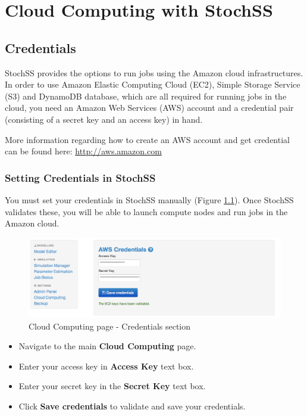 \chapter{Cloud Computing with StochSS}

\section{Credentials}
StochSS provides the options to run jobs using the Amazon cloud infrastructures. In order to use Amazon Elastic Computing Cloud (EC2), Simple Storage Service (S3) and DynamoDB database, which are all required for running jobs in the cloud, you need an Amazon Web Services (AWS) account and a credential pair (consisting of a secret key and an access key) in hand. 

More information regarding how to create an AWS account and get credential can be found here: \url{http://aws.amazon.com}

\subsection{Setting Credentials in StochSS}
You must set your credentials in StochSS manually (Figure \ref{fig:1}). Once StochSS validates these, you will be able to launch compute nodes and run jobs in the Amazon cloud.

\begin{figure}[!ht]
\centering
\includegraphics[scale=0.45]{T6/T6_fig_credentials.png}
\caption{Cloud Computing page - Credentials section}
\label{fig:1}
\end{figure}

\begin{itemize}
\item Navigate to the main \textbf{Cloud Computing} page.
\item Enter your access key in \textbf{Access Key} text box.
\item Enter your secret key in the \textbf{Secret Key} text box. 
\item Click \textbf{Save credentials} to validate and save your credentials.
\end{itemize}

